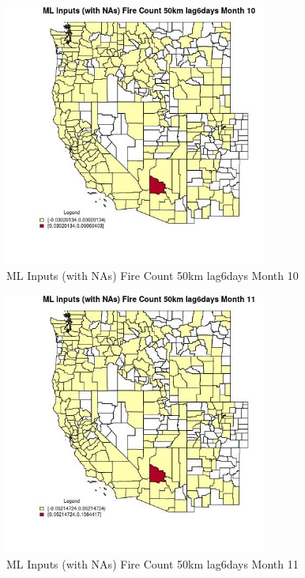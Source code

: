 \begin{figure} 
\centering  
\includegraphics[width=0.77\textwidth]{Code_Outputs/Report_ML_input_PM25_Step4_part_e_de_duplicated_aves_compiled_2019-05-20wNAs_CountyFire_Count_50km_lag6daysmedianMonth10.jpg} 
\caption{\label{fig:Report_ML_input_PM25_Step4_part_e_de_duplicated_aves_compiled_2019-05-20wNAsCountyFire_Count_50km_lag6daysmedianMonth10}ML Inputs (with NAs) Fire Count 50km lag6days Month 10} 
\end{figure} 
 

\clearpage 

\begin{figure} 
\centering  
\includegraphics[width=0.77\textwidth]{Code_Outputs/Report_ML_input_PM25_Step4_part_e_de_duplicated_aves_compiled_2019-05-20wNAs_CountyFire_Count_50km_lag6daysmedianMonth11.jpg} 
\caption{\label{fig:Report_ML_input_PM25_Step4_part_e_de_duplicated_aves_compiled_2019-05-20wNAsCountyFire_Count_50km_lag6daysmedianMonth11}ML Inputs (with NAs) Fire Count 50km lag6days Month 11} 
\end{figure} 
 


